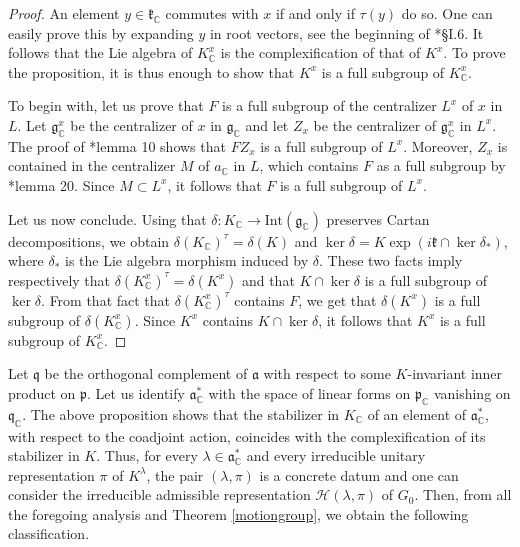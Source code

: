 \documentclass{amsart}
\theoremstyle{definition}
\begin{document}
\begin{proof}
An element $y \in \mathfrak{k}_\mathbb{C}$ commutes with $x$ if and only if $\tau(y)$ do so. One can easily prove this by expanding $y$ in root vectors, see the beginning of \cite{KostantRallis}*{§I.6}. It follows that the Lie algebra of $K_\mathbb{C}^x$ is the complexification of that of $K^x$. To prove the proposition, it is thus enough to show that $K^x$ is a full subgroup of $K_\mathbb{C}^x$.

To begin with, let us prove that $F$ is a full subgroup of the centralizer $L^x$ of $x$ in $L$. Let $\mathfrak{g}_\mathbb{C}^x$ be the centralizer of $x$ in $\mathfrak{g}_\mathbb{C}$ and let $Z_x$ be the centralizer of $\mathfrak{g}_\mathbb{C}^x$ in $L^x$. The proof of \cite{KostantRallis}*{lemma 10} shows that $F Z_x$ is a full subgroup of $L^x$. Moreover, $Z_x$ is contained in the centralizer $M$ of $a_\mathbb{C}$ in $L$, which contains $F$ as a full subgroup by \cite{KostantRallis}*{lemma 20}. Since $M \subset L^x$, it follows that $F$ is a full subgroup of $L^x$.

Let us now conclude. Using that $\delta : K_\mathbb{C} \to \mathrm{Int}(\mathfrak{g}_\mathbb{C})$ preserves Cartan decompositions, we obtain $\delta(K_\mathbb{C})^\tau = \delta(K)$ and $\ker \delta = K \exp(i \mathfrak{k}\cap\ker \delta_*)$, where $\delta_*$ is the Lie algebra morphism induced by $\delta$. These two facts imply respectively that $\delta(K_\mathbb{C}^x)^\tau = \delta(K^x)$ and that $K \cap \ker \delta$ is a full subgroup of $\ker \delta$. From that fact that $\delta(K_\mathbb{C}^x)^\tau$ contains $F$, we get that $\delta(K^x)$ is a full subgroup of $\delta(K_\mathbb{C}^x)$. Since $K^x$ contains $K\cap \ker \delta$, it follows that $K^x$ is a full subgroup of $K_\mathbb{C}^x$.
\end{proof}

Let $\mathfrak{q}$ be the orthogonal complement of $\mathfrak{a}$ with respect to some $K$-invariant inner product on $\mathfrak{p}$. Let us identify $\mathfrak{a}_\mathbb{C}^*$ with the space of linear forms on $\mathfrak{p}_\mathbb{C}$ vanishing on $\mathfrak{q}_\mathbb{C}$. The above proposition shows that the stabilizer in $K_\mathbb{C}$ of an element of $\mathfrak{a}_\mathbb{C}^*$, with respect to the coadjoint action, coincides with the complexification of its stabilizer in $K$. Thus, for every $\lambda \in \mathfrak{a}^*_\mathbb{C}$ and every irreducible unitary representation $\pi$ of $K^\lambda$, the pair $(\lambda, \pi)$ is a concrete datum and one can consider the irreducible admissible representation $\mathcal{H}(\lambda, \pi)$ of $G_0$. Then, from all the foregoing analysis and Theorem \ref{motiongroup}, we obtain the following classification.
\end{document}
